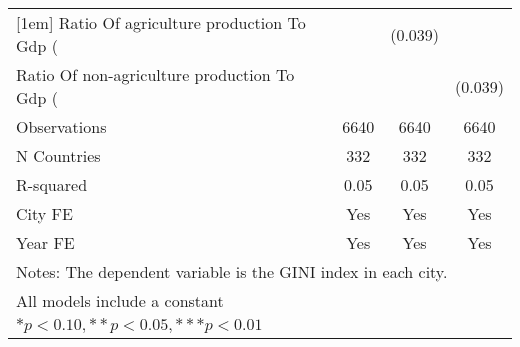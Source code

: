 {\begin{tabular}{l*{3}{c}}
[1em]
Ratio Of agriculture production To Gdp (%
                    &                     &     (0.039)         &                     \\
[1em]
Ratio Of non-agriculture production To Gdp (%
                    &                     &                     &     (0.039)         \\
\hline
Observations        &        6640         &        6640         &        6640         \\
N Countries         &         332         &         332         &         332         \\
R-squared           &        0.05         &        0.05         &        0.05         \\
City FE             &         Yes         &         Yes         &         Yes         \\
Year FE             &         Yes         &         Yes         &         Yes         \\
\hline\hline
\multicolumn{4}{l}{\footnotesize Notes: The dependent variable is the GINI index in each city.}\\
\multicolumn{4}{l}{\footnotesize All models include a constant}\\
\multicolumn{4}{l}{\footnotesize $* p<0.10, ** p<0.05, *** p<0.01$}\\
\end{tabular}
}
